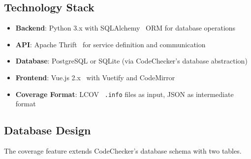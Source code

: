 \subsection{Technology Stack}

\begin{itemize}
    \item \textbf{Backend}: Python 3.x with SQLAlchemy~\cite{sqlalchemy} ORM for database operations
    \item \textbf{API}: Apache Thrift~\cite{thrift} for service definition and communication
    \item \textbf{Database}: PostgreSQL or SQLite (via CodeChecker's database abstraction)
    \item \textbf{Frontend}: Vue.js 2.x~\cite{vuejs} with Vuetify and CodeMirror~\cite{codemirror}
    \item \textbf{Coverage Format}: LCOV~\cite{lcov} \texttt{.info} files as input, JSON as intermediate format
\end{itemize}

\subsection{Database Design}

The coverage feature extends CodeChecker's database schema with two tables.

